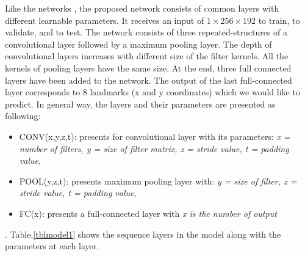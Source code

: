 \documentclass[10pt]{article}
\begin{document}
Like the networks \cite{lecun2010convolutional, li2015convolutional, cintas2016automatic}, the proposed network consists of common layers with different learnable parameters. It receives an input of $1 \times 256 \times 192$ to train, to validate, and to  test. The network consists of three repeated-structures of a convolutional layer followed by a maximum pooling layer. The depth
of convolutional layers increases with different size of the filter kernels.
All the kernels of pooling layers have the same size. 
At the end, three full connected layers have been added to the
network. %
 The output of the last full-connected
layer corresponds to 8 landmarks (x and y coordinates) which
we would like to predict. In general way, the layers and their parameters are presented as following:
\begin{itemize}
	\item CONV(x,y,z,t): presents for convolutional layer with its parameters: \textit{x = number of filters, y = size of filter matrix, z = stride value, t = padding value},
	\item POOL(y,z,t): presents maximum pooling layer with: \textit{y = size of filter, z = stride value, t = padding value},
	\item FC(x): presents a full-connected layer with \textit{x is the number of output}
\end{itemize}.
Table.\ref{tblmodel1} shows the sequence layers in the model along with the parameters at each layer.
\end{document}
